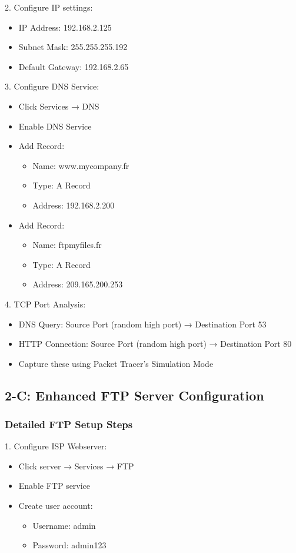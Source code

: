\documentclass[12pt]{article}
\begin{document}
2. Configure IP settings:
   \begin{itemize}
   \item IP Address: 192.168.2.125
   \item Subnet Mask: 255.255.255.192
   \item Default Gateway: 192.168.2.65
   \end{itemize}

3. Configure DNS Service:
   \begin{itemize}
   \item Click Services → DNS
   \item Enable DNS Service
   \item Add Record:
     \begin{itemize}
     \item Name: www.mycompany.fr
     \item Type: A Record
     \item Address: 192.168.2.200
     \end{itemize}
   \item Add Record:
     \begin{itemize}
     \item Name: ftpmyfiles.fr
     \item Type: A Record
     \item Address: 209.165.200.253
     \end{itemize}
   \end{itemize}

4. TCP Port Analysis:
   \begin{itemize}
   \item DNS Query: Source Port (random high port) → Destination Port 53
   \item HTTP Connection: Source Port (random high port) → Destination Port 80
   \item Capture these using Packet Tracer's Simulation Mode
   \end{itemize}

\subsection{2-C: Enhanced FTP Server Configuration}

\subsubsection{Detailed FTP Setup Steps}
1. Configure ISP Webserver:
   \begin{itemize}
   \item Click server → Services → FTP
   \item Enable FTP service
   \item Create user account:
     \begin{itemize}
     \item Username: admin
     \item Password: admin123
     \end{itemize}
   \end{itemize}
\end{document}
